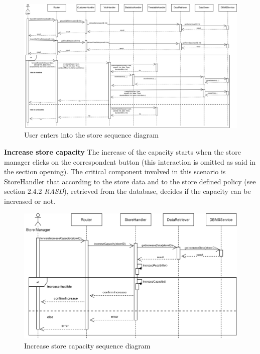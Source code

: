 \documentclass[]{article}
\begin{document}
	\begin{figure}[H]
		\centering
		\includegraphics[scale=0.57]{ComponentView/bookAVisitRuntimeView.png}
		\caption{User enters into the store sequence diagram}
	\end{figure}
	
	\newpage
	\noindent
	\textbf{Increase store capacity}
	\newline \newline
	The increase of the capacity starts when the store manager clicks on the correspondent button (this interaction is omitted as said in the section opening). The critical component involved in this scenario is StoreHandler that according to the store data and to the store defined policy (see section 2.4.2 \textit{RASD}), retrieved from the database, decides if the capacity can be increased or not.
	\medskip
	\begin{figure}[H]
		\centering
		\includegraphics[scale=0.65]{increaseSequence}
		\caption{Increase store capacity sequence diagram}
	\end{figure}
	
\end{document}
